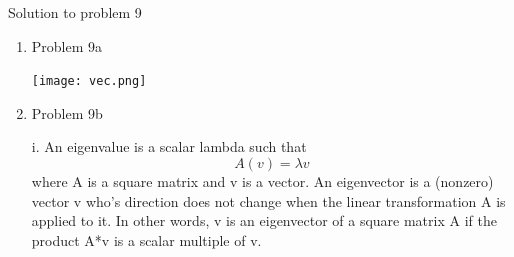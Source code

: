 \documentclass[11pt]{article}
\newcommand{\solution}[1]{{{\color{blue}{\bf Solution:} {#1}}}}
\begin{document}
\solution{Solution to problem 9}
\begin{enumerate}
\item Problem 9a

\texttt{[image: vec.png]}

\vspace{0.5cm}
\item Problem 9b

\solution{
i. An eigenvalue is a scalar lambda such that \[ A(v) = \lambda v \] where A is a square matrix and v is a vector. \newline An eigenvector is a (nonzero) vector v who's direction does not change when the linear transformation A is applied to it. In other words, v is an eigenvector of a square matrix A if the product A*v is a scalar multiple of v. \newline 

}
\end{enumerate}
\end{document}
